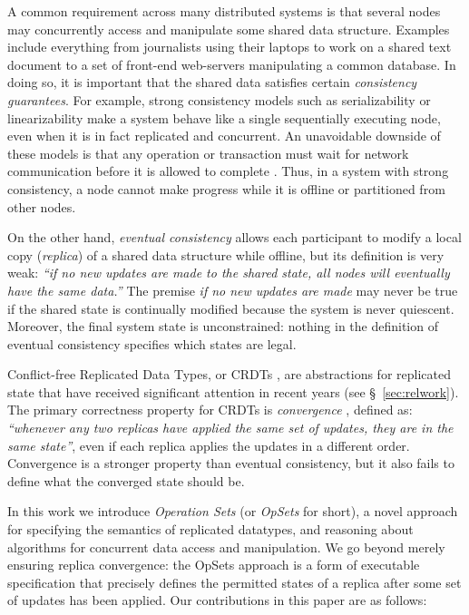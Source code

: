 \documentclass[11pt]{article}
\begin{document}
A common requirement across many distributed systems is that several nodes may concurrently access and manipulate some shared data structure.
Examples include everything from journalists using their laptops to work on a shared text document to a set of front-end web-servers manipulating a common database.
In doing so, it is important that the shared data satisfies certain \emph{consistency guarantees}.
For example, strong consistency models such as serializability \cite{Kleppmann:2017wj} or linearizability \cite{Herlihy:1990jq} make a system behave like a single sequentially executing node, even when it is in fact replicated and concurrent.
An unavoidable downside of these models is that any operation or transaction must wait for network communication before it is allowed to complete \cite{Davidson:1985hv,Gilbert:2002il}.
Thus, in a system with strong consistency, a node cannot make progress while it is offline or partitioned from other nodes.

On the other hand, \emph{eventual consistency} \cite{Bailis:2013jc,Burckhardt:2014hy,Terry:1994fp,Vogels:2009ca} allows each participant to modify a local copy (\emph{replica}) of a shared data structure while offline, but its definition is very weak: \emph{``if no new updates are made to the shared state, all nodes will eventually have the same data.''}
The premise \emph{if no new updates are made} may never be true if the shared state is continually modified because the system is never quiescent.
Moreover, the final system state is unconstrained: nothing in the definition of eventual consistency specifies which states are legal.

Conflict-free Replicated Data Types, or CRDTs \cite{Shapiro:2011wy,Shapiro:2011un}, are abstractions for replicated state that have received significant attention in recent years (see \S~\ref{sec:relwork}).
The primary correctness property for CRDTs is \emph{convergence} \cite{Shapiro:2011un,Gomes:2017gy}, defined as: \emph{``whenever any two replicas have applied the same set of updates, they are in the same state''}, even if each replica applies the updates in a different order.
Convergence is a stronger property than eventual consistency, but it also fails to define what the converged state should be.

In this work we introduce \emph{Operation Sets} (or \emph{OpSets} for short), a novel approach for specifying the semantics of replicated datatypes, and reasoning about algorithms for concurrent data access and manipulation.
We go beyond merely ensuring replica convergence: the OpSets approach is a form of executable specification that precisely defines the permitted states of a replica after some set of updates has been applied.
Our contributions in this paper are as follows:
\end{document}

